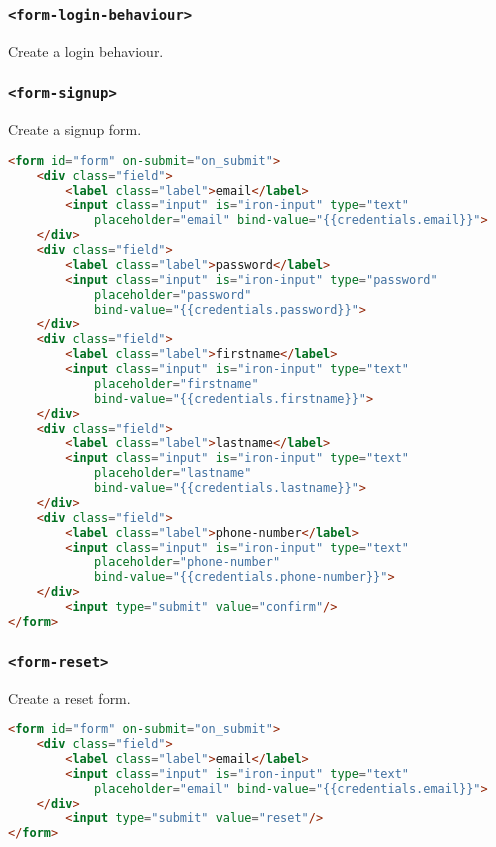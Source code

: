 \subsubsection{\texttt{<form-login-behaviour>}} 

Create a login behaviour.

\subsubsection{\texttt{<form-signup>}}

Create a signup form.
\begin{lstlisting}[language=html]
<form id="form" on-submit="on_submit">
    <div class="field">
        <label class="label">email</label>
        <input class="input" is="iron-input" type="text" 
    		placeholder="email" bind-value="{{credentials.email}}">
    </div>
    <div class="field">
        <label class="label">password</label>
        <input class="input" is="iron-input" type="password" 
        	placeholder="password" 
        	bind-value="{{credentials.password}}">
    </div>
    <div class="field">
        <label class="label">firstname</label>
        <input class="input" is="iron-input" type="text" 
        	placeholder="firstname" 
        	bind-value="{{credentials.firstname}}">
    </div>
    <div class="field">
        <label class="label">lastname</label>
        <input class="input" is="iron-input" type="text" 
        	placeholder="lastname" 
        	bind-value="{{credentials.lastname}}">
    </div>
    <div class="field">
        <label class="label">phone-number</label>
        <input class="input" is="iron-input" type="text" 
        	placeholder="phone-number" 
        	bind-value="{{credentials.phone-number}}">
    </div>
      	<input type="submit" value="confirm"/>
</form>
\end{lstlisting}


\subsubsection{\texttt{<form-reset>}}

Create a reset form.
\begin{lstlisting}[language=html]
<form id="form" on-submit="on_submit">
    <div class="field">
        <label class="label">email</label>
        <input class="input" is="iron-input" type="text" 
    		placeholder="email" bind-value="{{credentials.email}}">
    </div>
      	<input type="submit" value="reset"/>
</form>
\end{lstlisting}


